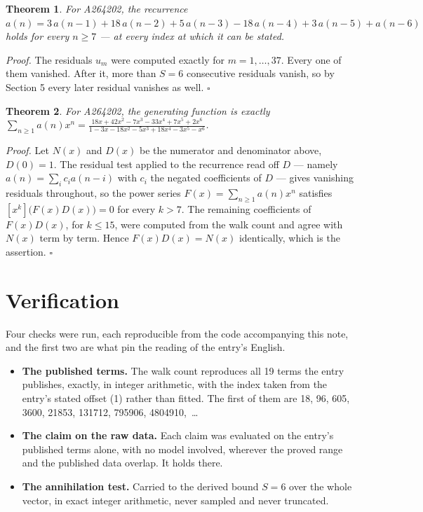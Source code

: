 \documentclass[11pt]{article}
\newtheorem{theorem}{Theorem}
\theoremstyle{definition}
\begin{document}
\begin{theorem} For A264202, the recurrence $a(n) = 3\,a(n-1) + 18\,a(n-2) + 5\,a(n-3) - 18\,a(n-4) + 3\,a(n-5) + a(n-6)$ holds for every $n \ge 7$ --- at every index at which it can be stated.\end{theorem}

{\itshape Proof.} The residuals $u_m$ were computed exactly for $m = 1,\dots,37$. Every one of them vanished. After it, more than $S = 6$ consecutive residuals vanish, so by Section 5 every later residual vanishes as well. $\square$

\begin{theorem} For A264202, the generating function is exactly $\sum_{n\ge 1} a(n)x^n = \frac{18x + 42x^{2} - 7x^{3} - 33x^{4} + 7x^{5} + 2x^{6}}{1 - 3x - 18x^{2} - 5x^{3} + 18x^{4} - 3x^{5} - x^{6}}$.\end{theorem}

{\itshape Proof.} Let $N(x)$ and $D(x)$ be the numerator and denominator above, $D(0)=1$. The residual test applied to the recurrence read off $D$ --- namely $a(n) = \sum_i c_i a(n-i)$ with $c_i$ the negated coefficients of $D$ --- gives vanishing residuals throughout, so the power series $F(x)=\sum_{n\ge 1}a(n)x^n$ satisfies $[x^k]\bigl(F(x)D(x)\bigr) = 0$ for every $k > 7$. The remaining coefficients of $F(x)D(x)$, for $k \le 15$, were computed from the walk count and agree with $N(x)$ term by term. Hence $F(x)D(x) = N(x)$ identically, which is the assertion. $\square$

\section{Verification}

Four checks were run, each reproducible from the code accompanying this note, and the first two are what pin the reading of the entry's English.

\begin{itemize}

\item {\bfseries The published terms.} The walk count reproduces all 19 terms the entry publishes, exactly, in integer arithmetic, with the index taken from the entry's stated offset (1) rather than fitted. The first of them are 18, 96, 605, 3600, 21853, 131712, 795906, 4804910,~\dots

\item {\bfseries The claim on the raw data.} Each claim was evaluated on the entry's published terms alone, with no model involved, wherever the proved range and the published data overlap. It holds there.

\item {\bfseries The annihilation test.} Carried to the derived bound $S = 6$ over the whole vector, in exact integer arithmetic, never sampled and never truncated.

\end{itemize}
\end{document}
